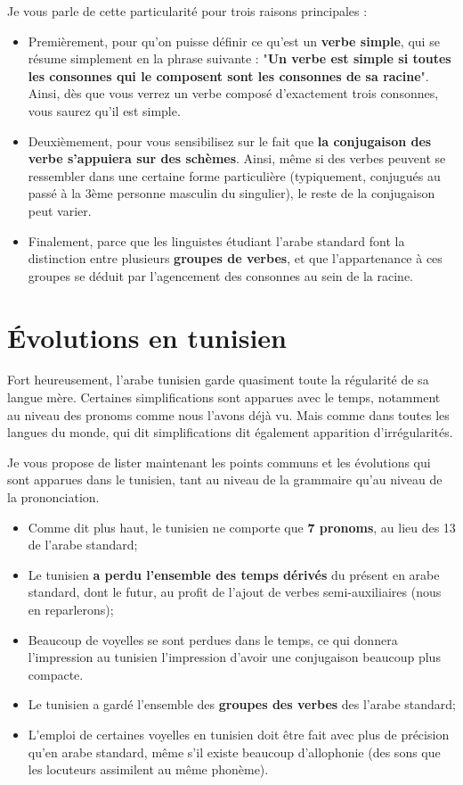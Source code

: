 Je vous parle de cette particularité pour trois raisons principales :
\begin{itemize}
    \item Premièrement, pour qu'on puisse définir ce qu'est un \textbf{verbe simple}, qui se résume simplement en la phrase suivante : "\textbf{Un verbe est simple si toutes les consonnes qui le composent sont les consonnes de sa racine}". Ainsi, dès que vous verrez un verbe composé d'exactement trois consonnes, vous saurez qu'il est simple.
    \item Deuxièmement, pour vous sensibilisez sur le fait que \textbf{la conjugaison des verbe s'appuiera sur des schèmes}. Ainsi, même si des verbes peuvent se ressembler dans une certaine forme particulière (typiquement, conjugués au passé à la 3ème personne masculin du singulier), le reste de la conjugaison peut varier.
    \item Finalement, parce que les linguistes étudiant l'arabe standard font la distinction entre plusieurs \textbf{groupes de verbes}, et que l'appartenance à ces groupes se déduit par l'agencement des consonnes au sein de la racine. 
\end{itemize}


\section{Évolutions en tunisien}

Fort heureusement, l'arabe tunisien garde quasiment toute la régularité de sa langue mère. Certaines simplifications sont apparues avec le temps, notamment au niveau des pronoms comme nous l'avons déjà vu. Mais comme dans toutes les langues du monde, qui dit simplifications dit également apparition d'irrégularités.

Je vous propose de lister maintenant les points communs et les évolutions qui sont apparues dans le tunisien, tant au niveau de la grammaire qu'au niveau de la prononciation.

\begin{itemize}
    \item Comme dit plus haut, le tunisien ne comporte que \textbf{7 pronoms}, au lieu des 13 de l'arabe standard;
    \item Le tunisien \textbf{a perdu l'ensemble des temps dérivés} du présent en arabe standard, dont le futur, au profit de l'ajout de verbes semi-auxiliaires (nous en reparlerons);
    \item Beaucoup de voyelles se sont perdues dans le temps, ce qui donnera  l'impression au tunisien l'impression d'avoir une conjugaison beaucoup plus compacte.
    \item Le tunisien a gardé l'ensemble des \textbf{groupes des verbes} des l'arabe standard;
    \item L'emploi de certaines voyelles en tunisien doit être fait avec plus de précision qu'en arabe standard, même s'il existe beaucoup d'allophonie (des sons que les locuteurs assimilent au même phonème).
\end{itemize}

